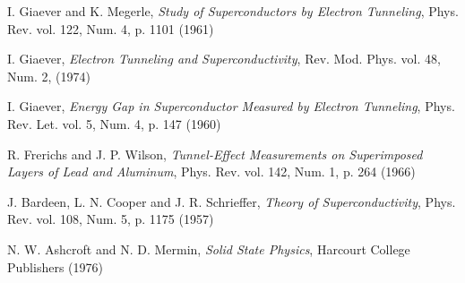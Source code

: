 \documentclass[twocolumn,a4paper,10pt,twoside]{article}
\begin{document}
\begin{thebibliography}{99}

 I. Giaever and K. Megerle, \emph{Study of Superconductors by Electron Tunneling}, Phys. Rev. vol. 122, Num. 4, p. 1101 (1961)

 I. Giaever, \emph{Electron Tunneling and Superconductivity}, Rev. Mod. Phys. vol. 48, Num. 2, (1974)

 I. Giaever, \emph{Energy Gap in Superconductor Measured by Electron Tunneling}, Phys. Rev. Let. vol. 5, Num. 4, p. 147 (1960)

 R. Frerichs and J. P. Wilson, \emph{Tunnel-Effect Measurements on Superimposed Layers of Lead and Aluminum}, Phys. Rev. vol. 142, Num. 1, p. 264 (1966)

 J. Bardeen, L. N. Cooper and J. R. Schrieffer, \emph{Theory of Superconductivity}, Phys. Rev. vol. 108, Num. 5, p. 1175 (1957)

 N. W. Ashcroft and N. D. Mermin, \emph{Solid State Physics}, Harcourt College Publishers (1976)

\end{thebibliography}
\end{document}
